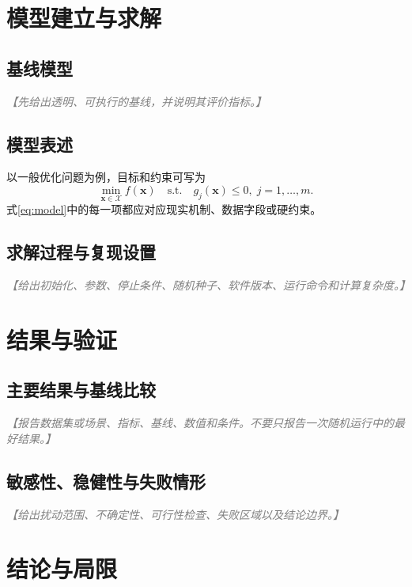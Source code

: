 \documentclass[UTF8,zihao=-4,fontset=fandol,a4paper]{ctexart}
\newcommand{\placeholder}[1]{\textcolor{gray}{\textit{【#1】}}}
\begin{document}
\section{模型建立与求解}

\subsection{基线模型}

\placeholder{先给出透明、可执行的基线，并说明其评价指标。}

\subsection{模型表述}

以一般优化问题为例，目标和约束可写为
\begin{equation}
  \min_{\bm{x}\in\mathcal{X}} f(\bm{x})
  \quad \text{s.t.} \quad
  g_j(\bm{x}) \le 0,\; j=1,\ldots,m .
  \label{eq:model}
\end{equation}
式\eqref{eq:model}中的每一项都应对应现实机制、数据字段或硬约束。

\subsection{求解过程与复现设置}

\placeholder{给出初始化、参数、停止条件、随机种子、软件版本、运行命令和计算复杂度。}

\section{结果与验证}

\subsection{主要结果与基线比较}

\placeholder{报告数据集或场景、指标、基线、数值和条件。不要只报告一次随机运行中的最好结果。}

\subsection{敏感性、稳健性与失败情形}

\placeholder{给出扰动范围、不确定性、可行性检查、失败区域以及结论边界。}

\section{结论与局限}
\end{document}

